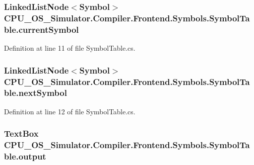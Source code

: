 \subsubsection[{current\+Symbol}]{\setlength{\rightskip}{0pt plus 5cm}Linked\+List\+Node$<${\bf Symbol}$>$ C\+P\+U\+\_\+\+O\+S\+\_\+\+Simulator.\+Compiler.\+Frontend.\+Symbols.\+Symbol\+Table.\+current\+Symbol\hspace{0.3cm}{\ttfamily [private]}}\label{class_c_p_u___o_s___simulator_1_1_compiler_1_1_frontend_1_1_symbols_1_1_symbol_table_a2fc3932216a6a0a499d47bc29a2b03c3}


Definition at line 11 of file Symbol\+Table.\+cs.

\hypertarget{class_c_p_u___o_s___simulator_1_1_compiler_1_1_frontend_1_1_symbols_1_1_symbol_table_aae0b08c3eb5d6ada83e944352bc77ebb}{}
\subsubsection[{next\+Symbol}]{\setlength{\rightskip}{0pt plus 5cm}Linked\+List\+Node$<${\bf Symbol}$>$ C\+P\+U\+\_\+\+O\+S\+\_\+\+Simulator.\+Compiler.\+Frontend.\+Symbols.\+Symbol\+Table.\+next\+Symbol\hspace{0.3cm}{\ttfamily [private]}}\label{class_c_p_u___o_s___simulator_1_1_compiler_1_1_frontend_1_1_symbols_1_1_symbol_table_aae0b08c3eb5d6ada83e944352bc77ebb}


Definition at line 12 of file Symbol\+Table.\+cs.

\hypertarget{class_c_p_u___o_s___simulator_1_1_compiler_1_1_frontend_1_1_symbols_1_1_symbol_table_a296a865c0445d3282c0b211853df56db}{}
\subsubsection[{output}]{\setlength{\rightskip}{0pt plus 5cm}Text\+Box C\+P\+U\+\_\+\+O\+S\+\_\+\+Simulator.\+Compiler.\+Frontend.\+Symbols.\+Symbol\+Table.\+output\hspace{0.3cm}{\ttfamily [private]}}\label{class_c_p_u___o_s___simulator_1_1_compiler_1_1_frontend_1_1_symbols_1_1_symbol_table_a296a865c0445d3282c0b211853df56db}


